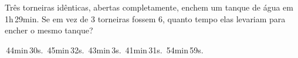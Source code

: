 Três torneiras idênticas, abertas completamente, enchem um tanque de água em 1h\,29min. Se em vez de $3$ torneiras fossem $6$, quanto tempo elas levariam para encher o mesmo tanque?

\,44min\,30s.
\,45min\,32s.
\,43min\,3s.
\,41min\,31s.
\,54min\,59s.



